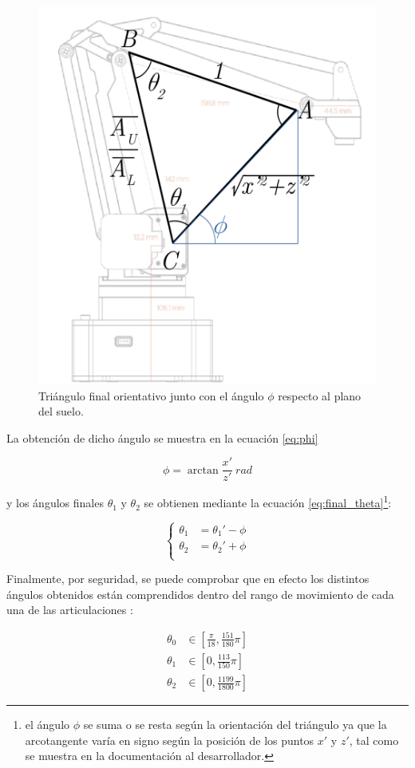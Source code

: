 \begin{figure}[H]
    \centering
    \includegraphics[width=.5\linewidth]{pictures/ik_final.png}
    \caption{Triángulo final orientativo junto con el ángulo $\phi$ respecto al plano del suelo.}
    \label{fig:final_triangle}
\end{figure}

La obtención de dicho ángulo se muestra en la ecuación \ref{eq:phi}

\begin{equation}\label{eq:phi}
    \phi = \arctan{\frac{x'}{z'}}~rad
\end{equation}

y los ángulos finales $\theta_1$ y $\theta_2$ se obtienen mediante la ecuación
\ref{eq:final_theta}\footnote{el ángulo $\phi$ se suma o se resta según la orientación
    del triángulo ya que la arcotangente varía en signo según la posición de los puntos
    $x'$ y $z'$, tal como se muestra en la documentación al desarrollador\cite{UArmDeveloperSwiftProForArduino}.}:

\begin{equation}\label{eq:final_theta}
    \left\{
    \begin{aligned}
        \theta_1 & = \theta_1' - \phi \\
        \theta_2 & = \theta_2' + \phi \\
    \end{aligned}
    \right.
\end{equation}

Finalmente, por seguridad, se puede comprobar que en efecto los distintos ángulos obtenidos
están comprendidos dentro del rango de movimiento de cada una de las articulaciones
\cite{UArmDeveloperSwiftProForArduino}:

\begin{align*}
    \theta_0 & \in \left[\frac{\pi}{18}, \frac{151}{180}\pi\right] \\
    \theta_1 & \in \left[0, \frac{113}{150}\pi\right]              \\
    \theta_2 & \in \left[0, \frac{1199}{1800}\pi\right]
\end{align*}